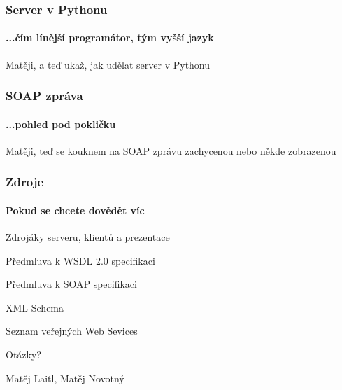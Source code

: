 \documentclass[12pt]{beamer}
\begin{document}
\begin{frame}
  \frametitle{Server v Pythonu}
  \framesubtitle{...čím línější programátor, tým vyšší jazyk}

  \begin{example}
    Matěji, a teď ukaž, jak udělat server v Pythonu
  \end{example}
\end{frame}

\begin{frame}
  \frametitle{SOAP zpráva}
  \framesubtitle{...pohled pod pokličku}

  \begin{example}
    Matěji, teď se kouknem na SOAP zprávu zachycenou nebo někde zobrazenou
  \end{example}
\end{frame}

\begin{frame}
  \frametitle{Zdroje}
  \framesubtitle{Pokud se chcete dovědět víc}
  \begin{thebibliography}{10}

  \beamertemplatearticlebibitems

    Zdrojáky serveru, klientů a prezentace

    Předmluva k WSDL 2.0 specifikaci

    Předmluva k SOAP specifikaci

    XML Schema

    Seznam veřejných Web Sevices

  \end{thebibliography}
\end{frame}

\begin{frame}
  \vspace{2cm}
  {\huge Otázky?}

  \vspace{3cm}
  \begin{flushright}
    Matěj Laitl, Matěj Novotný

  \end{flushright}
\end{frame}
\end{document}
